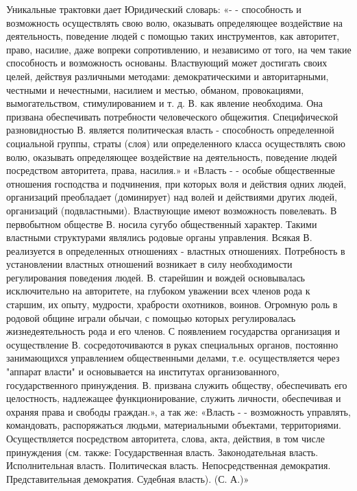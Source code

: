Уникальные трактовки дает Юридический словарь: «- - способность и возможность
осуществлять свою волю, оказывать определяющее воздействие на деятельность,
поведение людей с помощью таких инструментов, как авторитет, право, насилие,
даже вопреки сопротивлению, и независимо от того, на чем такие способность и
возможность основаны. Властвующий может достигать своих целей, действуя
различными методами: демократическими и авторитарными, честными и нечестными,
насилием и местью, обманом, провокациями, вымогательством, стимулированием и
т. д. В. как явление необходима. Она призвана обеспечивать потребности
человеческого общежития. Специфической разновидностью В. является политическая
власть - способность определенной социальной группы, страты (слоя) или
определенного класса осуществлять свою волю, оказывать определяющее
воздействие на деятельность, поведение людей посредством авторитета, права,
насилия.»  и   «Власть
- - особые общественные отношения господства и подчинения, при которых воля и
действия одних людей, организаций преобладает (доминирует) над волей и
действиями других людей, организаций (подвластными). Властвующие имеют
возможность повелевать. В первобытном обществе В. носила сугубо общественный
характер. Такими властными структурами являлись родовые органы управления.
Всякая В. реализуется в определенных отношениях - властных отношениях.
Потребность в установлении властных отношений возникает в силу необходимости
регулирования поведения людей. В. старейшин и вождей основывалась исключительно
на авторитете, на глубоком уважении всех членов рода к старшим, их опыту,
мудрости, храбрости охотников, воинов. Огромную роль в родовой общине играли
обычаи, с помощью которых регулировалась жизнедеятельность рода и его членов. С
появлением государства организация и осуществление В. сосредоточиваются в руках
специальных органов, постоянно занимающихся управлением общественными делами,
т.е. осуществляется через "аппарат власти" и основывается на институтах
организованного, государственного принуждения. В. призвана служить обществу,
обеспечивать его целостность, надлежащее функционирование, служить личности,
обеспечивая и охраняя права и свободы граждан.», а так же: «Власть
- - возможность управлять, командовать, распоряжаться людьми, материальными
объектами, территориями. Осуществляется посредством авторитета, слова, акта,
действия, в том числе принуждения (см. также: Государственная власть.
Законодательная власть. Исполнительная власть. Политическая власть.
Непосредственная демократия. Представительная демократия. Судебная власть). (С.
А.)»

